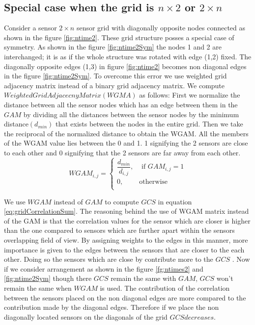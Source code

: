 \subsection{Special case when the grid is $n \times 2$ or $2 \times n$}
Consider a sensor $2 \times n$ sensor grid with diagonally opposite nodes connected as shown in the figure \ref{fig:ntime2}. These grid structure posses a special case of symmetry. As shown in the  figure \ref{fig:ntime2Sym} the nodes 1 and 2 are interchanged; it is as if the whole structure was rotated with  edge (1,2) fixed. The diagonally opposite edges (1,3) in figure \ref{fig:ntime2} becomes non diagonal edges in the figure \ref{fig:ntime2Sym}. To overcome this error we use weighted grid adjacency matrix instead of a binary grid adjacency matrix. We compute $Weighted Grid Adjacecny Matrix (WGMA)$ as follows:
First we normalize the distance between all the sensor nodes which has an edge between them in the $GAM$ by dividing all the distances between the sensor nodes by the minimum distance$(d_{min})$ that exists between the nodes in the entire grid. Then we take the reciprocal of the normalized distance to obtain the WGAM. All the members of the WGAM value lies between the 0 and 1. 1 signifying the 2 sensors are close to each other and 0 signifying that the 2 sensors are far away from each other.\\
\[
WGAM_{i,j} = 
\begin{cases}
\dfrac{d_{min}}{d_{i,j}}, &\text{ if } GAM_{i,j} = 1\\
0, & \text{otherwise}\\
\end{cases}
\]


We use $WGAM$ instead of $GAM$ to compute $GCS$ in equation \ref{eq:gridCorrelationSum}. The reasoning behind the use of WGAM matrix instead of the GAM is that the correlation values for the sensor which are closer is higher than the one compared to sensors which are further apart within the sensors overlapping field of view. By assigning weights to the edges in this manner, more importance is given to the edges between the sensors that are closer to the each other. Doing so the sensors which are close by contribute  more to the $GCS$ . 
Now if we consider arrangement as shown in the figure \ref{fg:ntimes2} and \ref{fig:ntime2Sym} though there $GCS$ remain the same with $GAM$, $GCS$ won't remain the same when $WGAM$ is used. The contribution of the correlation between the sensors placed on the non diagonal edges are more compared to the contribution made by the diagonal edges. Therefore if we place the non diagonally located sensors on the diagonals of the grid $GCS decreases$.

